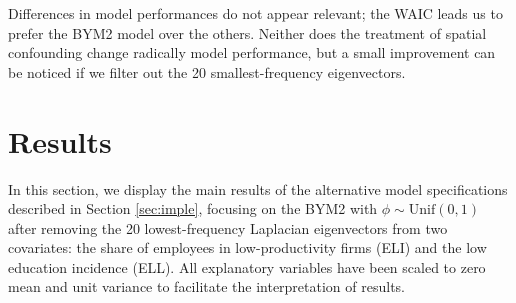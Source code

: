 \documentclass[openany, 11pt, oneside]{book}
\begin{document}
\begin{table}[ht]
{}
  \captionsetup{width=0.9\textwidth}
\caption{Model diagnostics using the Watanabe-Akaike criterion for four spatial models with three possible Spatial+ adjustments, consisting of removing either 15, 20 or 25 Laplacian eigenvectors from the covariates ELI and ELL. For the parameter controlling the spatial association in the PCAR, LCAR, and BYM2 models, we compare the Uniform prior and the PC prior with left-tail probability values of either $2/3$ and $0.9$, associated with upper boundaries of $0.5$ and $0.6$, respectively. The P\_eff column consists of the number of free parameters, i.e., the complexity component.}
\label{tab:waic}
\end{table}

Differences in model performances do not appear relevant; the WAIC leads us to prefer the BYM2 model over the others. Neither does the treatment of spatial confounding change radically model performance, but a small improvement can be noticed if we filter out the 20 smallest-frequency eigenvectors.



 
\section{Results} \label{section:VAW_results}
In this section, we display the main results of the alternative model specifications described in Section \ref{sec:imple}, focusing on the BYM2 with $\phi \sim \mathrm{Unif}(0,1)$ after removing the 20 lowest-frequency Laplacian eigenvectors \cite[applying the simplified Spatial+ correction proposed by][]{Urdangarin24} from two covariates: the share of employees in low-productivity firms (ELI) and the low education incidence (ELL). All explanatory variables have been scaled to zero mean and unit variance to facilitate the interpretation of results.
\end{document}
